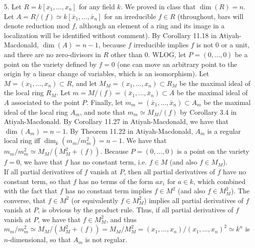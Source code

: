 \documentclass[11pt]{article}
\begin{document}
\num{5.} Let $R=k[x_1,\ldots,x_n]$ for any field $k$. We proved in class that $\dim(R)=n$. Let $A=R/(f)\simeq k[\bar{x}_1,\ldots,\bar{x}_n]$ for an irreducible $f\in R$ (throughout, bars will denote reduction mod $f$, although an element of a ring and its image in a localization will be identified without comment). By Corollary 11.18 in Atiyah-Macdonald, $\dim(A)=n-1$, because $f$ irreducible implies $f$ is not 0 or a unit, and there are no zero-divisors in $R$ other than 0. WLOG, let $P=(0,\ldots,0)$ be a point on the variety defined by $f=0$ (one can move an arbitrary point to the origin by a linear change of variables, which is an isomorphism). Let $M=(x_1,\ldots,x_n)\subset R$, and let $M_M=(x_1,\ldots,x_n)\subset R_M$ be the maximal ideal of the local ring $R_M$. Let $m=M/(f)=(\bar{x}_1,\ldots,\bar{x}_n)\subset A$ be the maximal ideal of $A$ associated to the point $P$. Finally, let $m_m=(\bar{x}_1,\ldots,\bar{x}_n)\subset A_m$ be the maximal ideal of the local ring $A_m$, and note that $m_m\simeq M_M/(f)$ by Corollary 3.4 in Atiyah-Macdonald. By Corollary 11.27 in Atiyah-Macdonald, we have that $\dim(A_m)=n-1$. By Theorem 11.22 in Atiyah-Macdonald, $A_m$ is a regular local ring iff $\dim_k(m_m/m_m^2)=n-1$. We have that $m_m/m_m^2\simeq M_M/(M_M^2+(f))$. Because $P=(0,\ldots,0)$ is a point on the variety $f=0$, we have that $f$ has no constant term, i.e. $f\in M$ (and also $f\in M_M$). \\


If all partial derivatives of $f$ vanish at $P$, then all partial derivatives of $f$ have no constant term, so that $f$ has no terms of the form $ax_i$ for $a\in k$, which combined with the fact that $f$ has no constant term implies $f\in M^2$ (and also $f\in M_M^2$). The converse, that $f\in M^2$ (or equivalently $f\in M_M^2$) implies all partial derivatives of $f$ vanish at $P$, is obvious by the product rule. Thus, if all partial derivatives of $f$ vanish at $P$, we have that $f\in M_M^2$, and thus $m_m/m_m^2\simeq M_M/(M_M^2+(f))=M_M/M_M^2=(x_1,\ldots,x_n)/(x_1,\ldots,x_n)^2\simeq k^n$ is $n$-dimensional, so that $A_m$ is not regular.\\
\end{document}
